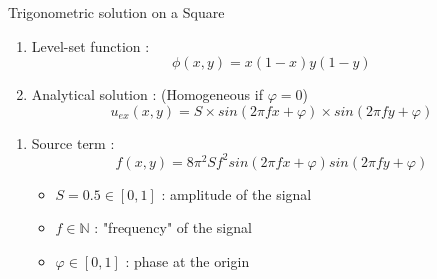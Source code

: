 \documentclass[compress,10pt,xcolor={table,dvipsnames},t]{beamer}
\begin{document}
	\begin{frame}{Trigonometric solution on a Square}
		\begin{minipage}{0.3\linewidth}
			\centering
		\end{minipage} \;
		\begin{minipage}{0.68\linewidth}
			\begin{enumerate}[\ding{217}]
				\item Level-set function : 
				$$\phi(x,y)=x(1-x)y(1-y)$$
				\item Analytical solution : (Homogeneous if $\varphi=0$)
				$$u_{ex}(x,y)=S\times sin\left(2\pi fx+\varphi\right)\times sin\left(2\pi fy+\varphi\right)$$				
			\end{enumerate}
		\end{minipage}
		
		\begin{enumerate}[\ding{217}]
			\item Source term : $$f(x,y)=8\pi^2 Sf^2sin\left(2\pi fx + \varphi\right)sin\left(2\pi fy + \varphi\right)$$
			
			\begin{minipage}{0.48\linewidth}
				\begin{itemize}
					\item $S=0.5\in[0,1]$ : amplitude of the signal 
					\item $f\in\mathbb{N}$ : "frequency" of the signal
					\item $\varphi\in[0,1]$ : phase at the origin
				\end{itemize}
			\end{minipage} \;
			\begin{minipage}{0.48\linewidth}
				\centering
			\end{minipage}
		\end{enumerate}
	\end{frame}
\end{document}
